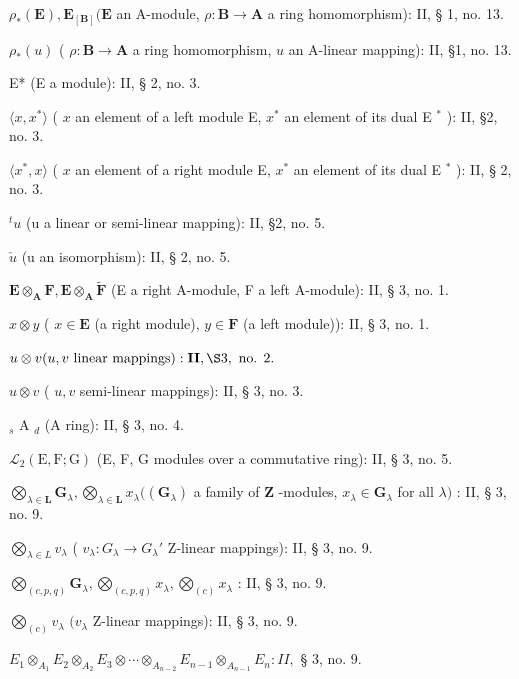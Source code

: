 \(\rho_{*}(\mathbf{E}), \mathbf{E}_{[\mathbf{B}]} (\mathbf{E}\) an A-module, \(\rho: \mathbf{B} \to \mathbf{A}\) a ring homomorphism): II, § 1, no. 13.

\(\rho_{*}(u)\) ( \(\rho: \mathbf{B} \to \mathbf{A}\) a ring homomorphism, \(u\) an A-linear mapping): II, §1, no. 13.

E* (E a module): II, § 2, no. 3.

\(\langle x, x^{*} \rangle\) ( \(x\) an element of a left module E, \(x^{*}\) an element of its dual E \(^{*}\) ): II, §2, no. 3.

\(\langle x^{*}, x \rangle\) ( \(x\) an element of a right module E, \(x^{*}\) an element of its dual E \(^{*}\) ): II, § 2, no. 3.

\(^{t}u\) (u a linear or semi-linear mapping): II, §2, no. 5.

\(\check{u}\) (u an isomorphism): II, § 2, no. 5.

\(\mathbf{E} \otimes_{\mathbf{A}} \mathbf{F}, \mathbf{E} \otimes_{\mathbf{A}} \tilde{\mathbf{F}}\) (E a right A-module, F a left A-module): II, § 3, no. 1.

\(x \otimes y\) ( \(x \in \mathbf{E}\) (a right module), \(y \in \mathbf{F}\) (a left module)): II, § 3, no. 1.

\(u \otimes v (u, v \text{ linear mappings}) : \mathbf{II}, \S 3, \text{ no. } 2.\)

\(u \otimes v\) ( \(u, v\) semi-linear mappings): II, § 3, no. 3.

\(_{s}\) A \(_{d}\) (A ring): II, § 3, no. 4.

\(\mathcal{L}_2(\mathrm{E},\mathrm{F};\mathrm{G})\) (E, F, G modules over a commutative ring): II, § 3, no. 5.

\(\bigotimes_{\lambda \in \mathbf{L}} \mathbf{G}_{\lambda}, \bigotimes_{\lambda \in \mathbf{L}} x_{\lambda} ((\mathbf{G}_{\lambda})\) a family of \(\mathbf{Z}\) -modules, \(x_{\lambda} \in \mathbf{G}_{\lambda}\) for all \(\lambda)\) : II, § 3, no. 9.

\(\bigotimes_{\lambda \in L} v_{\lambda}\) ( \(v_{\lambda}: G_{\lambda} \to G_{\lambda}'\) Z-linear mappings): II, § 3, no. 9.

\(\bigotimes_{(c,p,q)} \mathbf{G}_{\lambda}, \bigotimes_{(c,p,q)} x_{\lambda}, \bigotimes_{(c)} x_{\lambda}\) : II, § 3, no. 9.

\(\bigotimes_{(c)}v_{\lambda}\) \((v_{\lambda}\) Z-linear mappings): II, § 3, no. 9.

\(E_{1} \otimes_{A_{1}} E_{2} \otimes_{A_{2}} E_{3} \otimes \cdots \otimes_{A_{n-2}} E_{n-1} \otimes_{A_{n-1}} E_{n}: II,\) § 3, no. 9.

